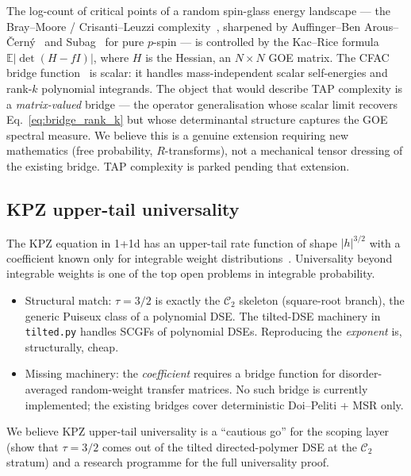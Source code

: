 \documentclass[10pt,a4paper,twocolumn]{article}
\theoremstyle{plain}
\theoremstyle{definition}
\newcommand{\Cstr}[1]{\mathcal{C}_{#1}}
\begin{document}
The log-count of critical points of a random spin-glass energy
landscape --- the Bray--Moore / Crisanti--Leuzzi
complexity~\citep{BrayMoore1980,CrisantiLeuzzi2005}, sharpened by
Auffinger--Ben Arous--\v{C}ern\'y~\citep{AuffingerBenArousCerny2013}
and Subag~\citep{Subag2017} for pure $p$-spin --- is controlled by
the Kac--Rice formula $\mathbb{E}|\det(H - f I)|$, where $H$ is the
Hessian, an $N\times N$ GOE matrix.
The CFAC bridge function~\citep[Section 4]{AmarteifioCFAC2026} is
scalar: it handles mass-independent scalar self-energies and rank-$k$
polynomial integrands.  The object that would describe TAP complexity
is a \emph{matrix-valued} bridge --- the operator generalisation
whose scalar limit recovers Eq.~\eqref{eq:bridge_rank_k} but whose
determinantal structure captures the GOE spectral measure.
We believe this is a genuine extension requiring new mathematics
(free probability, $R$-transforms), not a mechanical tensor dressing
of the existing bridge.
TAP complexity is parked pending that extension.

\subsection{KPZ upper-tail universality}

The KPZ equation in 1+1d has an upper-tail rate function of shape
$|h|^{3/2}$ with a coefficient known only for integrable weight
distributions~\citep{CorwinGhosal2020,Krajenbrink}.
Universality beyond integrable weights is one of the top open
problems in integrable probability.
\begin{itemize}[leftmargin=1.2em,itemsep=1pt]
  \item Structural match: $\tau = 3/2$ is exactly the $\Cstr{2}$
    skeleton (square-root branch), the generic Puiseux class of a
    polynomial DSE.  The tilted-DSE machinery in \texttt{tilted.py}
    handles SCGFs of polynomial DSEs.  Reproducing the
    \emph{exponent} is, structurally, cheap.
  \item Missing machinery: the \emph{coefficient} requires a bridge
    function for disorder-averaged random-weight transfer matrices.
    No such bridge is currently implemented; the existing bridges
    cover deterministic Doi--Peliti + MSR only.
\end{itemize}
We believe KPZ upper-tail universality is a ``cautious go'' for the
scoping layer (show that $\tau = 3/2$ comes out of the tilted
directed-polymer DSE at the $\Cstr{2}$ stratum) and a research
programme for the full universality proof.
\end{document}
